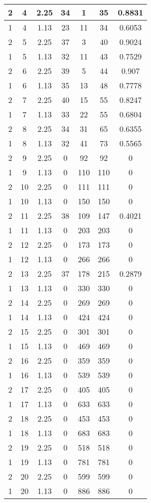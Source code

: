 \documentclass[letterpaper, 12pt]{article}
\begin{document}
\begin{longtable}{|c|c|c|c|c|c|c|}
\hline
2 & 4 & 2.25 & 34 & 1 & 35 & 0.8831 \\
\hline
1 & 4 & 1.13 & 23 & 11 & 34 & 0.6053 \\
\hline
2 & 5 & 2.25 & 37 & 3 & 40 & 0.9024 \\
\hline
1 & 5 & 1.13 & 32 & 11 & 43 & 0.7529 \\
\hline
2 & 6 & 2.25 & 39 & 5 & 44 & 0.907 \\
\hline
1 & 6 & 1.13 & 35 & 13 & 48 & 0.7778 \\
\hline
2 & 7 & 2.25 & 40 & 15 & 55 & 0.8247 \\
\hline
1 & 7 & 1.13 & 33 & 22 & 55 & 0.6804 \\
\hline
2 & 8 & 2.25 & 34 & 31 & 65 & 0.6355 \\
\hline
1 & 8 & 1.13 & 32 & 41 & 73 & 0.5565 \\
\hline
2 & 9 & 2.25 & 0 & 92 & 92 & 0 \\
\hline
1 & 9 & 1.13 & 0 & 110 & 110 & 0 \\
\hline
2 & 10 & 2.25 & 0 & 111 & 111 & 0 \\
\hline
1 & 10 & 1.13 & 0 & 150 & 150 & 0 \\
\hline
2 & 11 & 2.25 & 38 & 109 & 147 & 0.4021 \\
\hline
1 & 11 & 1.13 & 0 & 203 & 203 & 0 \\
\hline
2 & 12 & 2.25 & 0 & 173 & 173 & 0 \\
\hline
1 & 12 & 1.13 & 0 & 266 & 266 & 0 \\
\hline
2 & 13 & 2.25 & 37 & 178 & 215 & 0.2879 \\
\hline
1 & 13 & 1.13 & 0 & 330 & 330 & 0 \\
\hline
2 & 14 & 2.25 & 0 & 269 & 269 & 0 \\
\hline
1 & 14 & 1.13 & 0 & 424 & 424 & 0 \\
\hline
2 & 15 & 2.25 & 0 & 301 & 301 & 0 \\
\hline
1 & 15 & 1.13 & 0 & 469 & 469 & 0 \\
\hline
2 & 16 & 2.25 & 0 & 359 & 359 & 0 \\
\hline
1 & 16 & 1.13 & 0 & 539 & 539 & 0 \\
\hline
2 & 17 & 2.25 & 0 & 405 & 405 & 0 \\
\hline
1 & 17 & 1.13 & 0 & 633 & 633 & 0 \\
\hline
2 & 18 & 2.25 & 0 & 453 & 453 & 0 \\
\hline
1 & 18 & 1.13 & 0 & 683 & 683 & 0 \\
\hline
2 & 19 & 2.25 & 0 & 518 & 518 & 0 \\
\hline
1 & 19 & 1.13 & 0 & 781 & 781 & 0 \\
\hline
2 & 20 & 2.25 & 0 & 599 & 599 & 0 \\
\hline
1 & 20 & 1.13 & 0 & 886 & 886 & 0 \\
\hline
\end{longtable}
\end{document}
